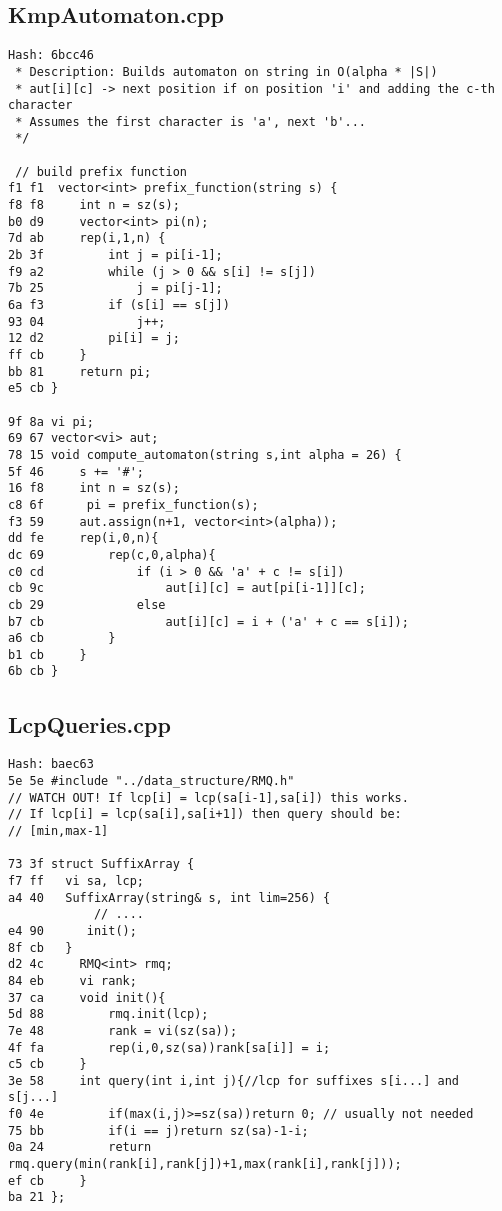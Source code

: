 \documentclass[11pt, a4paper, twoside]{article}
\begin{document}
\subsection{KmpAutomaton.cpp}
\begin{lstlisting}
Hash: 6bcc46
 * Description: Builds automaton on string in O(alpha * |S|)
 * aut[i][c] -> next position if on position 'i' and adding the c-th character 
 * Assumes the first character is 'a', next 'b'...
 */
 
 // build prefix function
f1 f1  vector<int> prefix_function(string s) {
f8 f8     int n = sz(s);
b0 d9     vector<int> pi(n);
7d ab     rep(i,1,n) {
2b 3f         int j = pi[i-1];
f9 a2         while (j > 0 && s[i] != s[j])
7b 25             j = pi[j-1];
6a f3         if (s[i] == s[j])
93 04             j++;
12 d2         pi[i] = j;
ff cb     }
bb 81     return pi;
e5 cb }

9f 8a vi pi;
69 67 vector<vi> aut;
78 15 void compute_automaton(string s,int alpha = 26) {
5f 46     s += '#'; 
16 f8     int n = sz(s);
c8 6f      pi = prefix_function(s);
f3 59     aut.assign(n+1, vector<int>(alpha));
dd fe     rep(i,0,n){
dc 69         rep(c,0,alpha){
c0 cd             if (i > 0 && 'a' + c != s[i])
cb 9c                 aut[i][c] = aut[pi[i-1]][c];
cb 29             else
b7 cb                 aut[i][c] = i + ('a' + c == s[i]);
a6 cb         }
b1 cb     }
6b cb }
\end{lstlisting}

\subsection{LcpQueries.cpp}
\begin{lstlisting}
Hash: baec63
5e 5e #include "../data_structure/RMQ.h"
// WATCH OUT! If lcp[i] = lcp(sa[i-1],sa[i]) this works.
// If lcp[i] = lcp(sa[i],sa[i+1]) then query should be:
// [min,max-1]

73 3f struct SuffixArray {
f7 ff 	vi sa, lcp;
a4 40 	SuffixArray(string& s, int lim=256) {
      		// ....
e4 90      init();
8f cb 	}
d2 4c     RMQ<int> rmq;
84 eb     vi rank;
37 ca     void init(){
5d 88         rmq.init(lcp);
7e 48         rank = vi(sz(sa));
4f fa         rep(i,0,sz(sa))rank[sa[i]] = i;
c5 cb     }
3e 58     int query(int i,int j){//lcp for suffixes s[i...] and s[j...]
f0 4e         if(max(i,j)>=sz(sa))return 0; // usually not needed
75 bb         if(i == j)return sz(sa)-1-i;
0a 24         return rmq.query(min(rank[i],rank[j])+1,max(rank[i],rank[j]));
ef cb     }
ba 21 };
\end{lstlisting}
\end{document}
